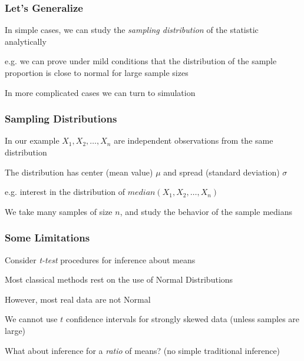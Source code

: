 \documentclass[12pt]{beamer}\usepackage[]{graphicx}\usepackage[]{color}
\begin{document}

\begin{frame}
\frametitle{Let's Generalize}

\bbi
  \item In simple cases, we can study the \textit{sampling distribution} of the statistic analytically
  \item e.g. we can prove under mild conditions that the distribution of the sample proportion is close to normal for large sample sizes
  \item In more complicated cases we can turn to simulation
\ei

\end{frame}


\begin{frame}
\frametitle{Sampling Distributions}

\bbi
  \item In our example $X_1, X_2, \dots, X_n$ are independent observations from the same distribution
  \item The distribution has center (mean value) $\mu$ and spread (standard deviation) $\sigma$
  \item e.g. interest in the distribution of $median(X_1, X_2, \dots, X_n)$
  \item We take many samples of size $n$, and study the behavior of the sample medians
\ei

\end{frame}


\begin{frame}
\frametitle{Some Limitations}

\bi
  \item Consider \textit{t-test} procedures for inference about means
  \item Most classical methods rest on the use of Normal Distributions
  \item However, most real data are not Normal
  \item We cannot use $t$ confidence intervals for strongly skewed data (unless samples are large)
  \item What about inference for a \textit{ratio} of means? (no simple traditional inference)
\ei

\end{frame}
\end{document}
